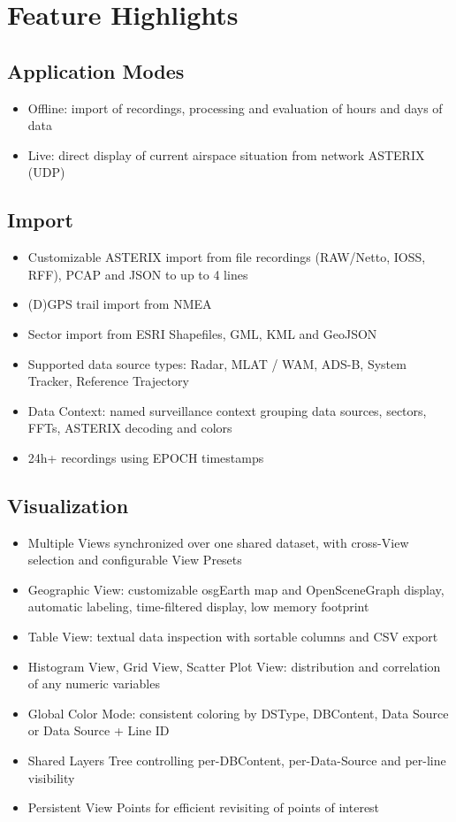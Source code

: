 \section{Feature Highlights}

\subsection{Application Modes}
\begin{itemize}
    \item Offline: import of recordings, processing and evaluation of hours and days of data
    \item Live: direct display of current airspace situation from network ASTERIX (UDP)
\end{itemize}

\subsection{Import}
\begin{itemize}
    \item Customizable ASTERIX import from file recordings (RAW/Netto, IOSS, RFF), PCAP and JSON to up to 4 lines
    \item (D)GPS trail import from NMEA
    \item Sector import from ESRI Shapefiles, GML, KML and GeoJSON
    \item Supported data source types: Radar, MLAT / WAM, ADS-B, System Tracker, Reference Trajectory
    \item Data Context: named surveillance context grouping data sources, sectors, FFTs, ASTERIX decoding and colors
    \item 24h+ recordings using EPOCH timestamps
\end{itemize}

\subsection{Visualization}
\begin{itemize}
    \item Multiple Views synchronized over one shared dataset, with cross-View selection and configurable View Presets
    \item Geographic View: customizable osgEarth map and OpenSceneGraph display, automatic labeling, time-filtered display, low memory footprint
    \item Table View: textual data inspection with sortable columns and CSV export
    \item Histogram View, Grid View, Scatter Plot View: distribution and correlation of any numeric variables
    \item Global Color Mode: consistent coloring by DSType, DBContent, Data Source or Data Source + Line ID
    \item Shared Layers Tree controlling per-DBContent, per-Data-Source and per-line visibility
    \item Persistent View Points for efficient revisiting of points of interest
\end{itemize}

